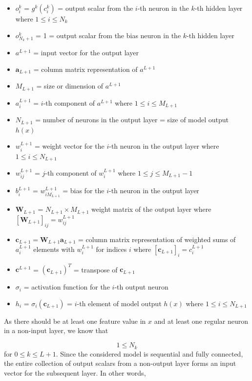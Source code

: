 \documentclass[letterpaper, 11pt]{article}
\numberwithin{equation}{section}
\numberwithin{figure}{section}
\numberwithin{table}{section}
\begin{document}
\begin{itemize}
	\item \(o^{k}_{i}\) = \(g^{k}(c^{k}_{i})\) = output scalar from the \(i\)-th neuron in the \(k\)-th hidden layer where \(1 \le i \le N_{k}\)
	\item \(o^{k}_{N_{k}+1}\) = 1 = output scalar from the bias neuron in the \(k\)-th hidden layer
	\item \(a^{L+1}\) = input vector for the output layer
	\item \(\textbf{a}_{L+1}\) = column matrix representation of \(a^{L+1}\)
	\item \(M_{L+1}\) = size or dimension of \(a^{L+1}\) 
	\item \(a^{L+1}_{i}\) = \(i\)-th component of \(a^{L+1}\) where \(1 \le i \le M_{L+1}\)
	\item \(N_{L+1}\) = number of neurons in the output layer = size of model output \(h(x)\)
	\item \(w^{L+1}_{i}\) = weight vector for the \(i\)-th neuron in the output layer where \(1 \le i \le N_{L+1}\)
	\item \(w^{L+1}_{ij}\) = \(j\)-th component of \(w^{L+1}_{i}\) where \(1 \le j \le M_{L+1} - 1\)
	\item \(b^{L+1}_{i}\) = \(w^{L+1}_{iM_{L+1}}\) = bias for the \(i\)-th neuron in the output layer
	\item \(\textbf{W}_{L+1}\) = \(N_{L+1} \times M_{L+1}\) weight matrix of the output layer where \([\textbf{W}_{L+1}]_{ij} = w^{L+1}_{ij}\)  
	\item \(\textbf{c}_{L+1} = \textbf{W}_{L+1}\textbf{a}_{L+1}\) = column matrix representation of weighted sums of \(a^{L+1}_{i}\) elements with \(w^{L+1}_{i}\) for indices \(i\) where \([\textbf{c}_{L+1}]_{i} = c^{L+1}_{i}\)
	\item \(\textbf{c}^{L+1}\) = \((\textbf{c}_{L+1})^{T}\) = transpose of \(\textbf{c}_{L+1}\)
	\item \(\sigma_{i}\) = activation function for the \(i\)-th output neuron
	\item \(h_{i}\) = \(\sigma_{i}(\textbf{c}_{L+1})\) = \(i\)-th element of model output \(h(x)\) where \(1 \le i \le N_{L+1}\)
\end{itemize}
As there should be at least one feature value in \(x\) and at least one regular neuron in a non-input layer, we know that 

\begin{equation}
	1 \le N_{k}
\end{equation}
for \(0 \le k \le L+1\). Since the considered model is sequential and fully connected, the entire collection of output scalars from a non-output layer forms an input vector for the subsequent layer. In other words, 
\end{document}
